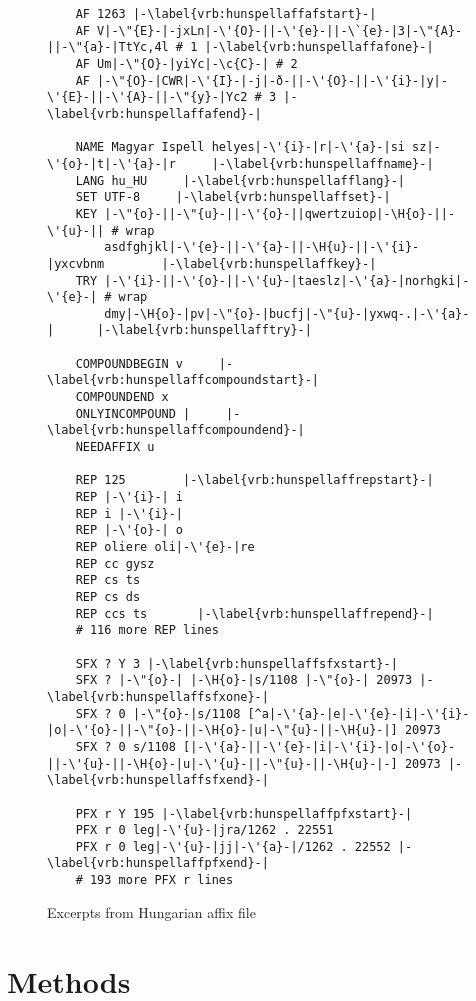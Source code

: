 \documentclass[a4paper,runningheads]{llncs}
\begin{document}
\begin{figure}[tbp]
  \centering
  \begin{lstlisting}
    AF 1263 |-\label{vrb:hunspellaffafstart}-|
    AF V|-\"{E}-|-jxLn|-\'{O}-||-\'{e}-||-\`{e}-|3|-\"{A}-||-\"{a}-|TtYc,4l # 1 |-\label{vrb:hunspellaffafone}-|
    AF Um|-\"{O}-|yiYc|-\c{C}-| # 2
    AF |-\"{O}-|CWR|-\'{I}-|-j|-ð-||-\'{O}-||-\'{i}-|y|-\'{E}-||-\'{A}-||-\"{y}-|Yc2 # 3 |-\label{vrb:hunspellaffafend}-|

    NAME Magyar Ispell helyes|-\'{i}-|r|-\'{a}-|si sz|-\'{o}-|t|-\'{a}-|r     |-\label{vrb:hunspellaffname}-|
    LANG hu_HU     |-\label{vrb:hunspellafflang}-|
    SET UTF-8     |-\label{vrb:hunspellaffset}-|
    KEY |-\"{o}-||-\"{u}-||-\'{o}-||qwertzuiop|-\H{o}-||-\'{u}-|| # wrap
        asdfghjkl|-\'{e}-||-\'{a}-||-\H{u}-||-\'{i}-|yxcvbnm        |-\label{vrb:hunspellaffkey}-|
    TRY |-\'{i}-||-\'{o}-||-\'{u}-|taeslz|-\'{a}-|norhgki|-\'{e}-| # wrap
        dmy|-\H{o}-|pv|-\"{o}-|bucfj|-\"{u}-|yxwq-.|-\'{a}-|      |-\label{vrb:hunspellafftry}-|
    
    COMPOUNDBEGIN v     |-\label{vrb:hunspellaffcompoundstart}-|
    COMPOUNDEND x     
    ONLYINCOMPOUND |     |-\label{vrb:hunspellaffcompoundend}-|
    NEEDAFFIX u     
    
    REP 125        |-\label{vrb:hunspellaffrepstart}-|
    REP |-\'{i}-| i       
    REP i |-\'{i}-|       
    REP |-\'{o}-| o       
    REP oliere oli|-\'{e}-|re
    REP cc gysz       
    REP cs ts       
    REP cs ds       
    REP ccs ts       |-\label{vrb:hunspellaffrepend}-|
    # 116 more REP lines
    
    SFX ? Y 3 |-\label{vrb:hunspellaffsfxstart}-|
    SFX ? |-\"{o}-| |-\H{o}-|s/1108 |-\"{o}-| 20973 |-\label{vrb:hunspellaffsfxone}-|
    SFX ? 0 |-\"{o}-|s/1108 [^a|-\'{a}-|e|-\'{e}-|i|-\'{i}-|o|-\'{o}-||-\"{o}-||-\H{o}-|u|-\"{u}-||-\H{u}-|] 20973
    SFX ? 0 s/1108 [|-\'{a}-||-\'{e}-|i|-\'{i}-|o|-\'{o}-||-\'{u}-||-\H{o}-|u|-\'{u}-||-\"{u}-||-\H{u}-|-] 20973 |-\label{vrb:hunspellaffsfxend}-|
    
    PFX r Y 195 |-\label{vrb:hunspellaffpfxstart}-|
    PFX r 0 leg|-\'{u}-|jra/1262 . 22551
    PFX r 0 leg|-\'{u}-|jj|-\'{a}-|/1262 . 22552 |-\label{vrb:hunspellaffpfxend}-|
    # 193 more PFX r lines
  \end{lstlisting}
  \caption{Excerpts from Hungarian affix file}
  \label{fig:hunspell-aff-examples}
\end{figure}

\section{Methods}
\label{sec:methods}
\end{document}
